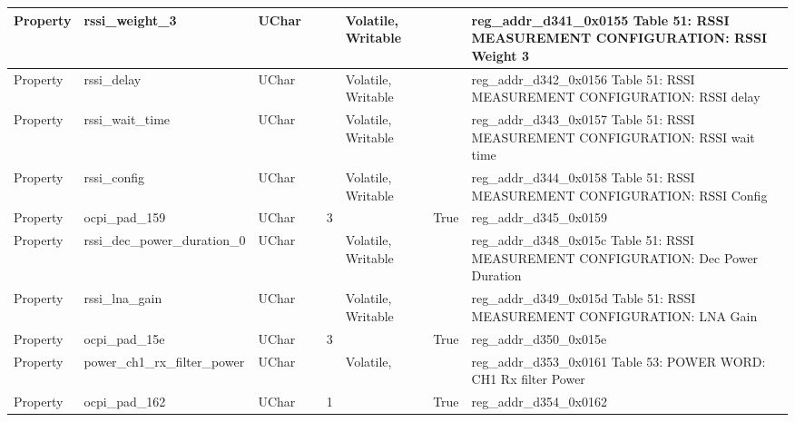 \documentclass{article}
\begin{document}
\begin{scriptsize}
\begin{longtable}{|p{2cm}|p{5cm}|p{1cm}|p{2cm}|p{2cm}|p{1.75cm}|p{1.5cm}|p{5.1cm}|}
  \hline
  Property & rssi\_weight\_3                                          & UChar &                  &                  & Volatile,  Writable &         & reg\_addr\_d341\_0x0155 Table 51: RSSI MEASUREMENT CONFIGURATION: RSSI Weight 3 \\
  \hline
  Property & rssi\_delay                                              & UChar &                  &                  & Volatile,  Writable &         & reg\_addr\_d342\_0x0156 Table 51: RSSI MEASUREMENT CONFIGURATION: RSSI delay \\
  \hline
  Property & rssi\_wait\_time                                         & UChar &                  &                  & Volatile,  Writable &         & reg\_addr\_d343\_0x0157 Table 51: RSSI MEASUREMENT CONFIGURATION: RSSI wait time \\
  \hline
  Property & rssi\_config                                             & UChar &                  &                  & Volatile,  Writable &         & reg\_addr\_d344\_0x0158 Table 51: RSSI MEASUREMENT CONFIGURATION: RSSI Config \\
  \hline
  Property & ocpi\_pad\_159                                           & UChar &                  & 3                &                     & True    & reg\_addr\_d345\_0x0159 \\
  \hline
  Property & rssi\_dec\_power\_duration\_0                            & UChar &                  &                  & Volatile,  Writable &         & reg\_addr\_d348\_0x015c Table 51: RSSI MEASUREMENT CONFIGURATION: Dec Power Duration \\
  \hline
  Property & rssi\_lna\_gain                                          & UChar &                  &                  & Volatile,  Writable &         & reg\_addr\_d349\_0x015d Table 51: RSSI MEASUREMENT CONFIGURATION: LNA Gain \\
  \hline
  Property & ocpi\_pad\_15e                                           & UChar &                  & 3                &                     & True    & reg\_addr\_d350\_0x015e \\
  \hline
  Property & power\_ch1\_rx\_filter\_power                            & UChar &                  &                  & Volatile,           &         & reg\_addr\_d353\_0x0161 Table 53: POWER WORD: CH1 Rx filter Power \\
  \hline
  Property & ocpi\_pad\_162                                           & UChar &                  & 1                &                     & True    & reg\_addr\_d354\_0x0162 \\

\end{longtable}
\end{scriptsize}
\end{document}
